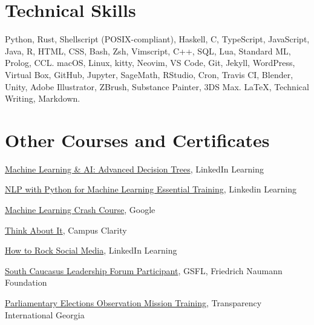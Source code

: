 \documentclass[a4paper,10pt,sans]{moderncv}
\begin{document}


\section{Technical Skills}
         {Python, Rust, Shellscript (POSIX-compliant), Haskell, C, TypeScript,
          JavaScript, Java, R, HTML, CSS, Bash, Zsh, Vimscript, C++, SQL, Lua,
          Standard ML, Prolog, CCL.}
         {macOS, Linux, kitty, Neovim, VS Code, Git, Jekyll, WordPress,
          Virtual Box, GitHub, Jupyter, SageMath, RStudio, Cron, Travis CI,
          Blender, Unity, Adobe Illustrator, ZBrush, Substance Painter,
          3DS Max.}
         {\LaTeX, Technical Writing, Markdown.}



\section{Other Courses and Certificates}
         {\href{https://www.linkedin.com/learning/machine-learning-ai-advanced-decision-trees}{Machine Learning \& AI: Advanced Decision Trees}, LinkedIn Learning}

         {\href{https://www.linkedin.com/learning/nlp-with-python-for-machine-learning-essential-training}{NLP with Python for Machine Learning Essential Training}, Linkedin Learning}

         {\href{https://developers.google.com/machine-learning/crash-course/}{Machine Learning Crash Course}, Google}

         {\href{https://www.davidoniani.com/assets/certificates/campus-clarity.jpg}{Think About It}, Campus Clarity}

         {\href{http://www.linkedin.com/learning/how-to-rock-social-media}{How to Rock Social Media}, LinkedIn Learning}

         {\href{https://www.davidoniani.com/assets/certificates/south-caucasus-leadership-forum-2016.jpg}{South Caucasus Leadership Forum Participant}, GSFL, Friedrich Naumann Foundation}

         {\href{https://www.transparency.ge/en}{Parliamentary Elections Observation Mission Training}, Transparency International Georgia}
\end{document}
